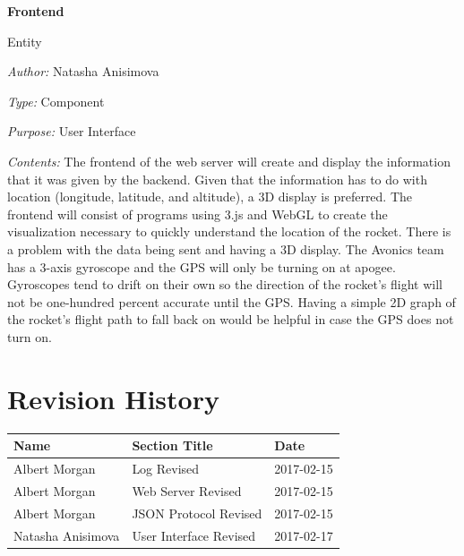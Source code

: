 \documentclass[10pt,draftclsnofoot,onecolumn]{IEEEtran}
\newcommand{\newentity}[5]{

	\noindent\textbf{#2}
	
	\noindent Entity
	
	\noindent\textit{Author:} {#1}
		
	\noindent\textit{Type:} {#3}
	
	\noindent\textit{Purpose:} {#4}

	\noindent\textit{Contents:} {#5}
	\vspace{.5cm}

}
\begin{document}
	\newentity
{Natasha Anisimova}
{Frontend}
{Component}
{User Interface}
{
	The frontend of the web server will create and display the information that it was given by the backend. Given
	that the information has to do with location
	(longitude, latitude, and altitude), a 3D display is preferred. The
	frontend will consist of programs using 3.js and WebGL to create the visualization necessary to quickly understand the
	location of the rocket. There is a problem with the data being sent and having a 3D display. The Avonics team has
	a 3-axis gyroscope and the GPS will only be turning on at apogee. Gyroscopes tend to drift on their own so the direction
	of the rocket's flight will not be one-hundred percent accurate until the GPS. Having a simple 2D graph of the rocket's
	flight path to fall back on would be helpful in case the GPS does not turn on.
}
	

\section*{Revision History}
\vspace{0.5cm}
\begin{tabular}{l | l | l}
Name & Section Title & Date\\ \hline
Albert Morgan & Log Revised & 2017-02-15\\
Albert Morgan & Web Server Revised & 2017-02-15\\
Albert Morgan & JSON Protocol Revised & 2017-02-15\\
Natasha Anisimova & User Interface Revised & 2017-02-17\\
\end{tabular}

	\clearpage
	\newpage
\end{document}
